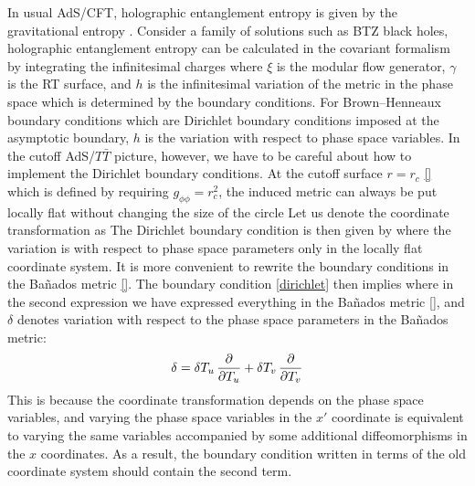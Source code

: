 \documentclass[12pt,a4paper,utf8]{article}
\begin{document}
In usual AdS/CFT, holographic entanglement entropy is given by the gravitational entropy \cite{Lewkowycz:2013nqa,}. Consider a family of solutions such as BTZ black holes, holographic entanglement entropy can be calculated in the covariant formalism by integrating the infinitesimal charges
where $\xi$ is the modular flow generator, $\gamma$ is the RT surface, and $h$ is the infinitesimal variation of the metric in the phase space which is determined by the boundary conditions. For Brown--Henneaux boundary conditions which are Dirichlet boundary conditions imposed at the asymptotic boundary, $h$ is the variation with respect to phase space variables. In the cutoff AdS/$T\bar T$ picture, however, we have to be careful about how to implement the Dirichlet boundary conditions. 
At the cutoff surface $r=r_c$ \eqref{} which is defined by requiring $g_{\phi\phi}=r_c^2$, the induced metric can always be put locally flat without changing the size of the circle 
Let us denote the coordinate transformation as
The Dirichlet boundary condition is then given by 
where the variation is with respect to phase space parameters only in the locally flat coordinate system.
It is more convenient to rewrite the boundary conditions in the Ba\~nados metric \eqref{}. 
The boundary condition \eqref{dirichlet} then implies 
where in the second expression we have expressed everything in the Ba\~nados metric \eqref{}, 
and $\delta $ denotes variation with respect to the phase space parameters in the Ba\~nados metric:
	\begin{equation}
		\delta
		= \mathinner{\delta T_u} \frac{\partial{}}{\partial{T_u}}
		+ \mathinner{\delta T_v} \frac{\partial{}}{\partial{T_v}} 
	\end{equation} 
This is because the coordinate transformation depends on the phase space variables, and varying the phase space variables in the $x'$ coordinate is equivalent to varying the same variables accompanied by some additional diffeomorphisms in the $x$ coordinates.  As a result, the boundary condition written in terms of the old coordinate system should contain the second term. 
\end{document}

